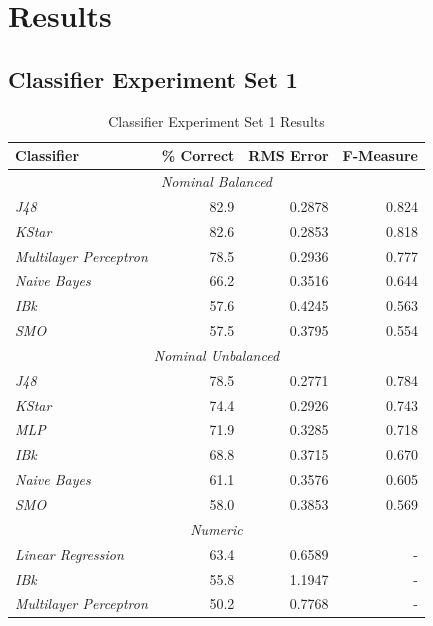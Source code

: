 \documentclass[../thesis/thesis.tex]{subfiles}
\begin{document}
 \chapter{Results}

 \section{Classifier Experiment Set 1}

\begin{table}
\centering
\begin{tabular}{|l|r|r|r|}
\hline
\textbf{Classifier}  & \textbf{\% Correct} & \textbf{RMS Error} & \textbf{F-Measure} \\ \hline
\multicolumn{4}{|c|}{\textit{Nominal Balanced}} \\ \hline
\textit{J48}         & 82.9                        & 0.2878             & 0.824              \\ \hline
\textit{KStar}       & 82.6                        & 0.2853             & 0.818              \\ \hline
\textit{Multilayer Perceptron}         & 78.5                        & 0.2936             & 0.777              \\ \hline
\textit{Naive Bayes} & 66.2                        & 0.3516             & 0.644              \\ \hline
\textit{IBk}         & 57.6                        & 0.4245             & 0.563              \\ \hline
\textit{SMO}         & 57.5                        & 0.3795             & 0.554              \\ \hline
\multicolumn{4}{|c|}{\textit{Nominal Unbalanced}} \\ \hline
\textit{J48}         & 78.5                        & 0.2771             & 0.784              \\ \hline
\textit{KStar}       & 74.4                        & 0.2926             & 0.743              \\ \hline
\textit{MLP}         & 71.9                        & 0.3285             & 0.718              \\ \hline
\textit{IBk}         & 68.8                        & 0.3715             & 0.670              \\ \hline
\textit{Naive Bayes} & 61.1                        & 0.3576             & 0.605              \\ \hline
\textit{SMO}         & 58.0                        & 0.3853             & 0.569              \\ \hline
\multicolumn{4}{|c|}{\textit{Numeric}} \\ \hline
\textit{Linear Regression}     & 63.4                        & 0.6589  &  -             \\ \hline
\textit{IBk}                   & 55.8                        & 1.1947  &  -          \\ \hline
\textit{Multilayer Perceptron} & 50.2                        & 0.7768  &  -          \\ \hline
\end{tabular}
\caption{Classifier Experiment Set 1 Results}
\label{tab:results:set1}
\end{table}
\end{document}
